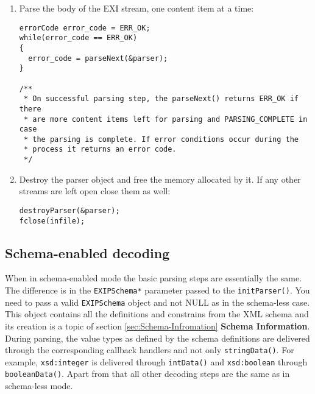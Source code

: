 \begin{enumerate}
 \item Parse the body of the EXI stream, one content item at a time:
\begin{lstlisting}
errorCode error_code = ERR_OK;
while(error_code == ERR_OK)
{
  error_code = parseNext(&parser);
}

/**
 * On successful parsing step, the parseNext() returns ERR_OK if there
 * are more content items left for parsing and PARSING_COMPLETE in case
 * the parsing is complete. If error conditions occur during the
 * process it returns an error code.
 */
\end{lstlisting}

 \item Destroy the parser object and free the memory allocated by it. If any other
streams are left open close them as well:
\begin{lstlisting}
destroyParser(&parser);
fclose(infile);
\end{lstlisting}

\end{enumerate}
\subsection{Schema-enabled decoding}
When in schema-enabled mode the basic parsing steps are essentially the same.
The difference is in the \texttt{EXIPSchema*} parameter passed to the \texttt{initParser()}.
You need to pass a valid \texttt{EXIPSchema} object and not NULL as in the schema-less
case. This object contains all the definitions and constrains from the XML schema and
its creation is a topic of section \ref{sec:Schema-Infromation} \textbf{Schema Information}.
During parsing, the value types as defined by the schema definitions
are delivered through the corresponding callback handlers and not only \texttt{stringData()}.
For example, \texttt{xsd:integer} is delivered through \texttt{intData()} and
\texttt{xsd:boolean} through \texttt{booleanData()}. Apart from that all other decoding steps
are the same as in schema-less mode.